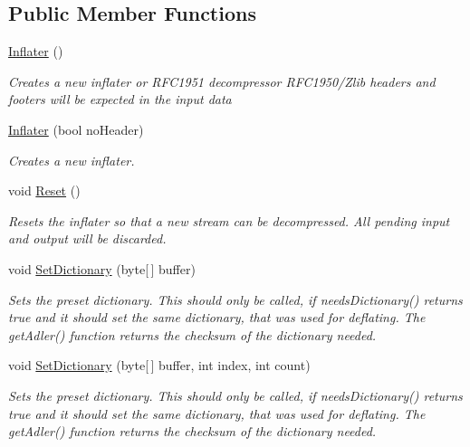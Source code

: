 \subsection*{Public Member Functions}
\begin{DoxyCompactItemize}
\item 
\hyperlink{class_i_c_sharp_code_1_1_sharp_zip_lib_1_1_zip_1_1_compression_1_1_inflater_aa1518202b80f82414879742fd1bc5e44}{Inflater} ()
\begin{DoxyCompactList}\small\item\em Creates a new inflater or R\+F\+C1951 decompressor R\+F\+C1950/\+Zlib headers and footers will be expected in the input data \end{DoxyCompactList}\item 
\hyperlink{class_i_c_sharp_code_1_1_sharp_zip_lib_1_1_zip_1_1_compression_1_1_inflater_a89e97fe8e5522be57c2de110655fbefb}{Inflater} (bool no\+Header)
\begin{DoxyCompactList}\small\item\em Creates a new inflater. \end{DoxyCompactList}\item 
void \hyperlink{class_i_c_sharp_code_1_1_sharp_zip_lib_1_1_zip_1_1_compression_1_1_inflater_acbaa9910d61e471a2832390c29734370}{Reset} ()
\begin{DoxyCompactList}\small\item\em Resets the inflater so that a new stream can be decompressed. All pending input and output will be discarded. \end{DoxyCompactList}\item 
void \hyperlink{class_i_c_sharp_code_1_1_sharp_zip_lib_1_1_zip_1_1_compression_1_1_inflater_a77ae6cd5e3d6cb82e366b0ffb453f4b1}{Set\+Dictionary} (byte\mbox{[}$\,$\mbox{]} buffer)
\begin{DoxyCompactList}\small\item\em Sets the preset dictionary. This should only be called, if needs\+Dictionary() returns true and it should set the same dictionary, that was used for deflating. The get\+Adler() function returns the checksum of the dictionary needed. \end{DoxyCompactList}\item 
void \hyperlink{class_i_c_sharp_code_1_1_sharp_zip_lib_1_1_zip_1_1_compression_1_1_inflater_a4fbf4573284725673347f385d0471fa4}{Set\+Dictionary} (byte\mbox{[}$\,$\mbox{]} buffer, int index, int count)
\begin{DoxyCompactList}\small\item\em Sets the preset dictionary. This should only be called, if needs\+Dictionary() returns true and it should set the same dictionary, that was used for deflating. The get\+Adler() function returns the checksum of the dictionary needed. \end{DoxyCompactList}\item 

\end{DoxyCompactItemize}
